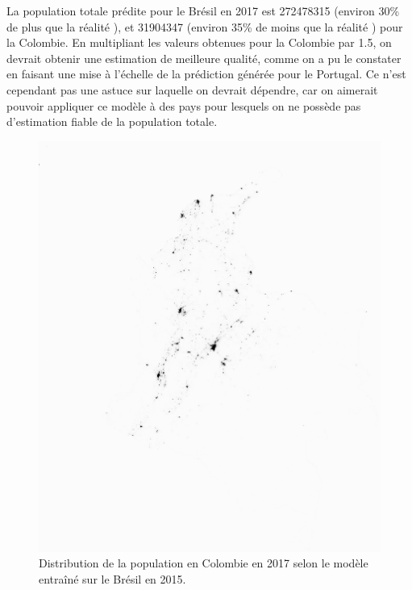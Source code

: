 \documentclass[a4paper, 11pt]{report}
\begin{document}
La population totale prédite pour le Brésil en 2017 est 272478315 (environ 30\% de plus que la réalité \cite{theworldbank}), et 31904347 (environ 35\% de moins que la réalité \cite{theworldbank}) pour la Colombie. En multipliant les valeurs obtenues pour la Colombie par 1.5, on devrait obtenir une estimation de meilleure qualité, comme on a pu le constater en faisant une mise à l'échelle de la prédiction générée pour le Portugal. Ce n'est cependant pas une astuce sur laquelle on devrait dépendre, car on aimerait pouvoir appliquer ce modèle à des pays pour lesquels on ne possède pas d'estimation fiable de la population totale.

\begin{figure}
	\centering
	\includegraphics[width=\textwidth]{img/pred_colombia_2017.png}
	\caption{Distribution de la population en Colombie en 2017 selon le modèle entraîné sur le Brésil en 2015.}
	\label{pred_colombia_2017}
\end{figure}
\end{document}
